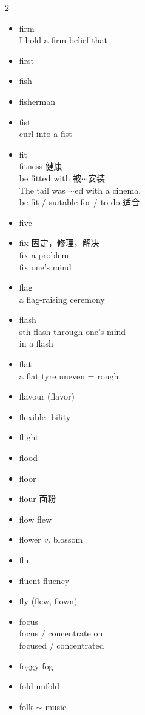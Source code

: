 \documentclass[../../book.tex]{subfiles}
\begin{document}
\begin{multicols}{2}
\begin{itemize}
\\\textcircled{2} 开火
\item[-] firm
\\I hold a firm belief that
\item[-] first
\item[-] fish
\item[-] fisherman
\item[-] fist
\\curl into a fist
\item[-] fit
\\fitness 健康
\\be fitted with 被$\cdots$安装 \\\phantom{aa} The tail was $\sim$ed with a cinema.
\\be fit / suitable for / to do 适合
\item[-] five
\item[-] fix 固定，修理，解决
\\fix a problem
\\fix one\textquoteright s mind
\item[-] flag
\\a flag-raising ceremony
\item[-] flash
\\sth flash through one\textquoteright s mind
\\in a flash
\item[-] flat
\\a flat tyre \phantom{a} uneven = rough
\item[-] flavour (flavor)
\item[-] flexible \phantom{a} -bility
\item[-] flight
\item[-] flood
\item[-] floor
\item[-] flour 面粉
\item[-] flow \phantom{a} flew
\item[-] flower \emph{v.} blossom
\item[-] flu
\item[-] fluent \phantom{a} fluency
\item[-] fly (flew, flown)
\item[-] focus
\\focus / concentrate on
\\focused / concentrated
\item[-] foggy \phantom{a} fog
\item[-] fold \phantom{a} unfold
\item[-] folk \phantom{a} $\sim$ music

\end{itemize}
\end{multicols}
\end{document}

